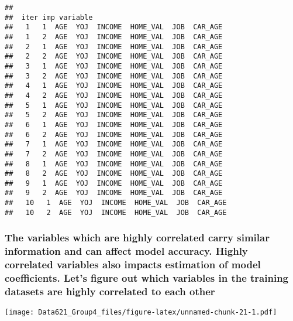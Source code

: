\documentclass[]{article}
\begin{document}
\begin{verbatim}
## 
##  iter imp variable
##   1   1  AGE  YOJ  INCOME  HOME_VAL  JOB  CAR_AGE
##   1   2  AGE  YOJ  INCOME  HOME_VAL  JOB  CAR_AGE
##   2   1  AGE  YOJ  INCOME  HOME_VAL  JOB  CAR_AGE
##   2   2  AGE  YOJ  INCOME  HOME_VAL  JOB  CAR_AGE
##   3   1  AGE  YOJ  INCOME  HOME_VAL  JOB  CAR_AGE
##   3   2  AGE  YOJ  INCOME  HOME_VAL  JOB  CAR_AGE
##   4   1  AGE  YOJ  INCOME  HOME_VAL  JOB  CAR_AGE
##   4   2  AGE  YOJ  INCOME  HOME_VAL  JOB  CAR_AGE
##   5   1  AGE  YOJ  INCOME  HOME_VAL  JOB  CAR_AGE
##   5   2  AGE  YOJ  INCOME  HOME_VAL  JOB  CAR_AGE
##   6   1  AGE  YOJ  INCOME  HOME_VAL  JOB  CAR_AGE
##   6   2  AGE  YOJ  INCOME  HOME_VAL  JOB  CAR_AGE
##   7   1  AGE  YOJ  INCOME  HOME_VAL  JOB  CAR_AGE
##   7   2  AGE  YOJ  INCOME  HOME_VAL  JOB  CAR_AGE
##   8   1  AGE  YOJ  INCOME  HOME_VAL  JOB  CAR_AGE
##   8   2  AGE  YOJ  INCOME  HOME_VAL  JOB  CAR_AGE
##   9   1  AGE  YOJ  INCOME  HOME_VAL  JOB  CAR_AGE
##   9   2  AGE  YOJ  INCOME  HOME_VAL  JOB  CAR_AGE
##   10   1  AGE  YOJ  INCOME  HOME_VAL  JOB  CAR_AGE
##   10   2  AGE  YOJ  INCOME  HOME_VAL  JOB  CAR_AGE
\end{verbatim}

\hypertarget{the-variables-which-are-highly-correlated-carry-similar-information-and-can-affect-model-accuracy.-highly-correlated-variables-also-impacts-estimation-of-model-coefficients.-lets-figure-out-which-variables-in-the-training-datasets-are-highly-correlated-to-each-other}{%
\subsubsection{\texorpdfstring{\textbf{The variables which are highly
correlated carry similar information and can affect model accuracy.
Highly correlated variables also impacts estimation of model
coefficients. Let's figure out which variables in the training datasets
are highly correlated to each
other}}{The variables which are highly correlated carry similar information and can affect model accuracy. Highly correlated variables also impacts estimation of model coefficients. Let's figure out which variables in the training datasets are highly correlated to each other}}\label{the-variables-which-are-highly-correlated-carry-similar-information-and-can-affect-model-accuracy.-highly-correlated-variables-also-impacts-estimation-of-model-coefficients.-lets-figure-out-which-variables-in-the-training-datasets-are-highly-correlated-to-each-other}}

\texttt{[image: Data621\_Group4\_files/figure-latex/unnamed-chunk-21-1.pdf]}
\end{document}

